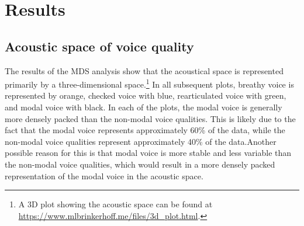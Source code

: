 
\section{Results} \label{sec:acousticlandscape:results}
\subsection{Acoustic space of voice quality} \label{sec:acousticlandscape:space}

The results of the MDS analysis show that the acoustical space is represented primarily by a three-dimensional space.\footnote{A 3D plot showing the acoustic space can be found at \href{https://www.mlbrinkerhoff.me/files/3d_plot.html}{https://www.mlbrinkerhoff.me/files/3d_plot.html}.} In all subsequent plots, breathy voice is represented by orange, checked voice with blue, rearticulated voice with green, and modal voice with black. In each of the plots, the modal voice is generally more densely packed than the non-modal voice qualities. This is likely due to the fact that the modal voice represents approximately 60\% of the data, while the non-modal voice qualities represent approximately 40\% of the data.Another possible reason for this is that modal voice is more stable and less variable than the non-modal voice qualities, which would result in a more densely packed representation of the modal voice in the acoustic space. 


